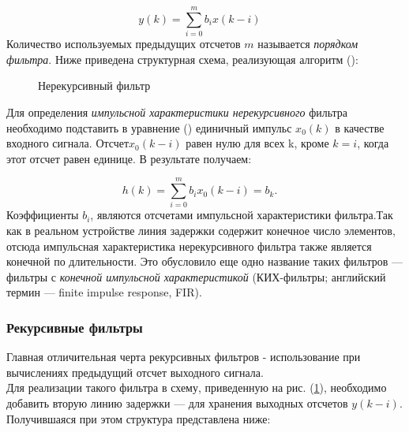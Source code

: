 \documentclass[a4paper,14pt]{article}
\begin{document}
\begin{equation}
	y(k) = \sum_{i=0}^m b_i x(k-i) \quad
\end{equation}
Количество используемых предыдущих отсчетов $m$ называется \textit{порядком фильтра}. Ниже приведена структурная схема, реализующая алгоритм (\theequation):

\begin{figure}[bh]
\noindent{}
\caption{Нерекурсивный фильтр}
\label{figCurves}
\end{figure}

Для определения \textit{импульсной характеристики нерекурсивного} фильтра необходимо подставить в уравнение (\theequation) единичный импульс $x_0(k)$ в качестве входного сигнала. Отсчет$x_0(k-i)$ равен нулю для всех k, кроме $k=i$, когда этот отсчет равен единице. В результате получаем:

\begin{equation}
	h(k) = \sum_{i=0}^m b_i x_0(k-i)=b_k. \quad
\end{equation}
 Коэффициенты  $b_i$, являются отсчетами импульсной характеристики фильтра.Так как в реальном устройстве линия задержки содержит конечное число элементов, отсюда импульсная характеристика нерекурсивного фильтра также является конечной по длительности. Это обусловило еще одно название таких фильтров —
фильтры с \textit{конечной импульсной характеристикой} (КИХ-фильтры; английский термин — finite impulse response, FIR).

\subsubsection{Рекурсивные фильтры}
Главная отличительная черта рекурсивных фильтров - использование при вычислениях предыдущий отсчет выходного сигнала. \\
Для реализации такого фильтра в схему, приведенную на рис. (\ref{figCurves}), необходимо добавить вторую линию задержки — для хранения выходных отсчетов $y(k - i)$. Получившаяся при этом структура представлена ниже:
\end{document}
